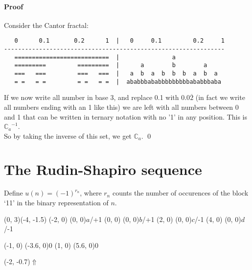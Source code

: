 \documentclass{article}
\begin{document}
\paragraph{Proof} Consider the Cantor fractal:
\begin{verbatim}
   0      0.1       0.2      1  |   0     0.1         0.2     1
---------------------------------------------------------------
   ===========================  |               a
   =========         =========  |      a        b        a
   ===   ===         ===   ===  |   a  b  a  b  b  b  a  b  a
   = =   = =         = =   = =  |  ababbbababbbbbbbbbababbbaba
\end{verbatim}
If we now write all number in base 3, and replace 0.1 with 0.0$\overline2$ 
(in fact we write all numbers ending with an 1 like this) we are left with 
all numbers between 0 and 1 that can be written in ternary notation with no 
'1' in any position. This is ${\mathbb{C}_a}^{-1}$.\\
So by taking the inverse of this set, we get $\mathbb{C}_a$. \qed

\section*{The Rudin-Shapiro sequence}
Define $u(n) = (-1)^{r_n}$, where $r_n$ counts the number of occurences of
the block `11' in the binary representation of $n$.

\begin{graph}(0, 3)(-4, -1.5)
  (-2, 0) (0, 0){$a$/+1}
  (0, 0)  (0, 0){$b$/+1}
  (2, 0)  (0, 0){$c$/-1}
  (4, 0)  (0, 0){$d$/-1}

  (-1, 0) \freetext(-3.6, 0){0}
   
   
   
   
   
  (1, 0) \freetext(5.6, 0){0}
   
  
  \freetext(-2, -0.7){$\Uparrow$}
\end{graph}\\
\end{document}
